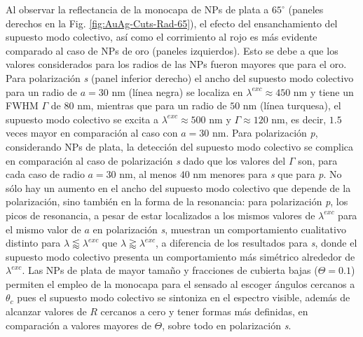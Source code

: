 Al observar la reflectancia de la monocapa de NPs de plata a $65^\circ$ (paneles derechos en la Fig. \ref{fig:AuAg-Cuts-Rad-65}), el efecto del ensanchamiento del supuesto modo colectivo, así como el corrimiento al rojo es más evidente comparado al caso de NPs de oro (paneles izquierdos). Esto se debe a  que los valores considerados para los radios de las NPs fueron mayores que para el oro. Para polarización \emph{s} (panel inferior derecho) el ancho del supuesto modo colectivo para un radio de $a=30$ nm (línea negra) se localiza en $\lambda^{exc}\approx 450$ nm y tiene un FWHM $\Gamma$ de $80$ nm, mientras que para un radio de $50$ nm (línea turquesa), el supuesto modo colectivo se excita a $\lambda^{exc}\approx 500$ nm y $\Gamma\approx 120$ nm, es decir, $1.5$ veces mayor en comparación al caso con $a=30$ nm. Para polarización \emph{p}, considerando NPs de plata, la detección del supuesto modo colectivo se complica en comparación al caso de polarización \emph{s} dado que los valores del $\Gamma$ son, para cada caso de radio $a=30$ nm, al menos $40$ nm menores para \emph{s} que para \emph{p}. No sólo hay un aumento en el ancho del supuesto modo colectivo que depende de la polarización, sino también en la forma de la resonancia: para polarización \emph{p}, los picos de resonancia, a pesar de estar localizados a los mismos valores de $\lambda^{exc}$ para el mismo valor de $a$ en polarización \emph{s},  muestran un comportamiento cualitativo distinto para $\lambda\lessapprox\lambda^{exc}$ que $\lambda\gtrapprox\lambda^{exc}$, a diferencia de los resultados para \emph{s}, donde el supuesto modo colectivo presenta un comportamiento más simétrico alrededor de $\lambda^{exc}$. Las NPs de plata de mayor tamaño y fracciones de cubierta bajas ($\Theta= 0.1$) permiten el empleo de la monocapa para el sensado al escoger ángulos cercanos a $\theta_c$ pues el supuesto modo colectivo se sintoniza en el espectro visible, además de alcanzar valores de $R$ cercanos a cero y tener formas más definidas, en comparación a valores mayores de $\Theta$, sobre todo en polarización \emph{s}.

